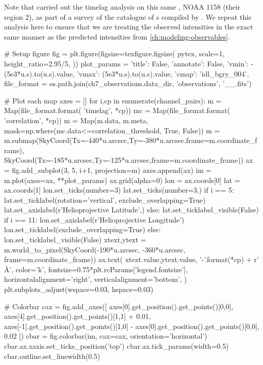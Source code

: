 Note that \citet{viall_survey_2017} carried out the timelag analysis on this same \AR{}, NOAA 1158 (their region 2), as part of a survey of the catalogue of \AR{}s compiled by \citet{warren_systematic_2012}. We repeat this analysis here to ensure that we are treating the observed intensities in the exact same manner as the predicted intensities from \autoref{ch:modeling-observables}.

\begin{pycode}
# Setup figure
fig = plt.figure(figsize=texfigure.figsize(
    pytex,
    scale=1,
    height_ratio=2.95/5,
))
plot_params = {
    'title': False, 
    'annotate': False,
    'vmin': -(5e3*u.s).to(u.s).value,
    'vmax': (5e3*u.s).to(u.s).value,
    'cmap': 'idl_bgry_004',
}
file_format = os.path.join(ch7_observations.data_dir, 'observations', '{}_{}_{}.fits')

# Plot each map
axes = []
for i,cp in enumerate(channel_pairs):
    m = Map(file_format.format( 'timelag', *cp))
    mc = Map(file_format.format( 'correlation', *cp))
    m = Map(m.data, m.meta, mask=np.where(mc.data<=correlation_threshold, True, False))
    m = m.submap(SkyCoord(Tx=-440*u.arcsec,Ty=-380*u.arcsec,frame=m.coordinate_frame),
                 SkyCoord(Tx=-185*u.arcsec,Ty=-125*u.arcsec,frame=m.coordinate_frame))
    ax = fig.add_subplot(3, 5, i+1, projection=m)
    axes.append(ax)
    im = m.plot(axes=ax, **plot_params)
    ax.grid(alpha=0)
    lon = ax.coords[0]
    lat = ax.coords[1]
    lon.set_ticks(number=3)
    lat.set_ticks(number=3,) 
    if i == 5:
        lat.set_ticklabel(rotation='vertical', exclude_overlapping=True)
        lat.set_axislabel(r'Helioprojective Latitude',)
    else:
        lat.set_ticklabel_visible(False)
    if i == 11:
        lon.set_axislabel(r'Helioprojective Longitude')
        lon.set_ticklabel(exclude_overlapping=True)
    else:
        lon.set_ticklabel_visible(False)
    xtext,ytext = m.world_to_pixel(SkyCoord(-190*u.arcsec, -360*u.arcsec, frame=m.coordinate_frame))
    ax.text(
        xtext.value,ytext.value,
        '{}-{}'.format(*cp) + r' \si{\angstrom}',
        color='k',
        fontsize=0.75*plt.rcParams['legend.fontsize'],
        horizontalalignment='right',
        verticalalignment='bottom',
    )
plt.subplots_adjust(wspace=0.03, hspace=0.03)

# Colorbar
cax = fig.add_axes([
    axes[0].get_position().get_points()[0,0],
    axes[4].get_position().get_points()[1,1] + 0.01,
    axes[-1].get_position().get_points()[1,0] - axes[0].get_position().get_points()[0,0], 
    0.02
])
cbar = fig.colorbar(im, cax=cax, orientation='horizontal')
cbar.ax.xaxis.set_ticks_position('top')
cbar.ax.tick_params(width=0.5)
cbar.outline.set_linewidth(0.5)


\end{pycode}
